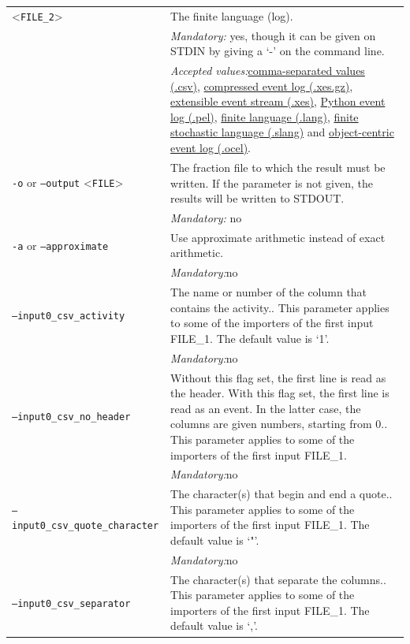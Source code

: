 {\begin{tabularx}{\linewidth}{lX}
<\texttt{FILE\_2}>&The finite language (log).\\
&\textit{Mandatory:} \quad yes, though it can be given on STDIN by giving a `-' on the command line.\\
&\textit{Accepted values:}\quad \hyperref[filehandler:comma-separated values]{comma-separated values (.csv)}, \hyperref[filehandler:compressed event log]{compressed event log (.xes.gz)}, \hyperref[filehandler:extensible event stream]{extensible event stream (.xes)}, \hyperref[filehandler:Python event log]{Python event log (.pel)}, \hyperref[filehandler:finite language]{finite language (.lang)}, \hyperref[filehandler:finite stochastic language]{finite stochastic language (.slang)} and \hyperref[filehandler:object-centric event log]{object-centric event log (.ocel)}.\\
\texttt{-o} or \texttt{--output} <\texttt{FILE}> &
The fraction file to which the result must be written. If the parameter is not given, the results will be written to STDOUT.\\
&\textit{Mandatory:} \quad no\\
\texttt{-a} or \texttt{--approximate} & Use approximate arithmetic instead of exact arithmetic.\\
&\textit{Mandatory:}\quad no\\
\texttt{--input0\_csv\_activity} & The name or number of the column that contains the activity.. This parameter applies to some of the importers of the first input FILE\_1. The default value is `1'.\\
&\textit{Mandatory:}\quad no\\
\texttt{--input0\_csv\_no\_header} & Without this flag set, the first line is read as the header. 
    With this flag set, the first line is read as an event. In the latter case, the columns are given numbers, starting from 0.. This parameter applies to some of the importers of the first input FILE\_1. \\
&\textit{Mandatory:}\quad no\\
\texttt{--input0\_csv\_quote\_character} & The character(s) that begin and end a quote.. This parameter applies to some of the importers of the first input FILE\_1. The default value is `"'.\\
&\textit{Mandatory:}\quad no\\
\texttt{--input0\_csv\_separator} & The character(s) that separate the columns.. This parameter applies to some of the importers of the first input FILE\_1. The default value is `,'.\\

\end{tabularx}}
